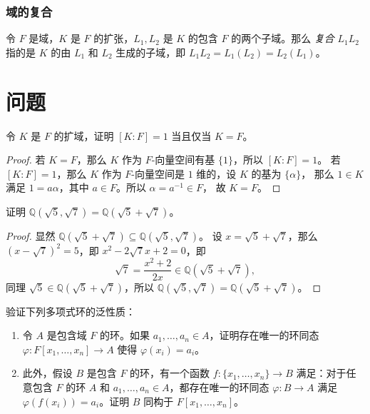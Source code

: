 \subsubsection{域的复合}

令 $F$ 是域，$K$ 是 $F$ 的扩张，$L_1,L_2$ 是 $K$ 的包含 $F$ 的两个子域。那么
\emph{复合} $L_1L_2$ 指的是 $K$ 的由 $L_1$ 和 $L_2$ 生成的子域，即
$L_1L_2=L_1(L_2)=L_2(L_1)$。


\section*{问题}

\begin{problem}
  令 $K$ 是 $F$ 的扩域，证明 $[K:F]=1$ 当且仅当 $K=F$。
\end{problem}
\begin{proof}
  若 $K=F$，那么 $K$ 作为 $F$-向量空间有基 $\{1\}$，所以 $[K:F]=1$。
  若 $[K:F]=1$，那么 $K$ 作为 $F$-向量空间是 $1$ 维的，设 $K$ 的基为 $\{\alpha\}$，
  那么 $1\in K$ 满足 $1=a\alpha$，其中 $a\in F$。所以 $\alpha=a^{-1}\in F$，
  故 $K=F$。
\end{proof}

\begin{problem}
  证明 $\mathbb{Q}(\sqrt{5},\sqrt{7})=\mathbb{Q}(\sqrt{5}+\sqrt{7})$。
\end{problem}
\begin{proof}
  显然 $\mathbb{Q}(\sqrt{5}+\sqrt{7})\subseteq \mathbb{Q}(\sqrt{5},\sqrt{7})$。
  设 $x=\sqrt{5}+\sqrt{7}$，那么 $(x-\sqrt{7})^2=5$，即 $x^2-2\sqrt{7}x+2=0$，即
  \[
    \sqrt{7}=\frac{x^2+2}{2x}\in \mathbb{Q}(\sqrt{5}+\sqrt{7}),
  \]
  同理 $\sqrt{5}\in \mathbb{Q}(\sqrt{5}+\sqrt{7})$，所以 $\mathbb{Q}(\sqrt{5},\sqrt{7})=\mathbb{Q}(\sqrt{5}+\sqrt{7})$。
\end{proof}

\begin{problem}
  验证下列多项式环的泛性质：
  \begin{enumerate}
    \item 令 $A$ 是包含域 $F$ 的环。如果 $a_1,\dots,a_n\in A$，证明存在唯一的环同态
    $\varphi:F[x_1,\dots,x_n]\to A$ 使得 $\varphi(x_i)=a_i$。
    \item 此外，假设 $B$ 是包含 $F$ 的环，有一个函数 $f:\{x_1,\dots,x_n\}\to B$
    满足：对于任意包含 $F$ 的环 $A$ 和 $a_1,\dots,a_n\in A$，都存在唯一的环同态
    $\varphi:B\to A$ 满足 $\varphi(f(x_i))=a_i$。证明 $B$ 同构于 $F[x_1,\dots,x_n]$。
  \end{enumerate}
\end{problem}


